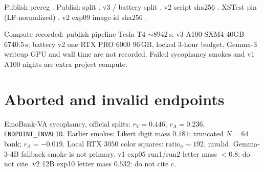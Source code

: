 \documentclass{article}
\begin{document}
Publish prereg .
Publish split .
v3 / battery split .
v2 script sha256 .
XSTest pin (LF-normalized) .
v2 exp09 image-id sha256 .

Compute recorded: publish pipeline Tesla T4 $\sim$8942\,s; v3 A100-SXM4-40GB $6740.5$\,s; battery v2 one RTX PRO 6000 96\,GB, locked 3-hour budget. Gemma-3 writeup GPU and wall time are not recorded. Failed sycophancy smokes and v1 A100 nights are extra project compute.

\section{Aborted and invalid endpoints}
\label{app:failed}

EmoBank-VA sycophancy, official splits: $r_V=0.446$, $r_A=0.236$, \texttt{ENDPOINT\_INVALID}. Earlier smokes: Likert digit mass $0.181$; truncated $N=64$ bank; $r_A=-0.019$. Local RTX 3050 color squares: $\mathrm{ratio}_a\sim 192$, invalid. Gemma-3-4B fallback smoke is not primary. v1 exp05 run1/run2 letter mass $<0.8$: do not cite. v2 12B exp10 letter mass $0.532$: do not cite $c$.

\newpage

\end{document}
